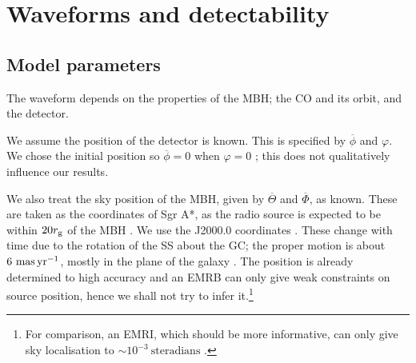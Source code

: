 \section{Waveforms and detectability}\label{sec:Waveforms}

\subsection{Model parameters}

The waveform depends on the properties of the MBH; the CO and its orbit, and the detector.

We assume the position of the detector is known. This is specified by $\overline{\phi}$ and $\varphi$. We chose the initial position so $\overline{\phi} = 0$ when $\varphi = 0$ \citep{Cutler1998}; this does not qualitatively influence our results.

We also treat the sky position of the MBH, given by $\overline{\Theta}$ and $\overline{\Phi}$, as known. These are taken as the coordinates of Sgr A*, as the radio source is expected to be within $20 r_\mathrm{g}$ of the MBH \citep{Reid2003,Doeleman2008}. We use the J2000.0 coordinates \citep{Reid1999, Yusef-Zadeh1999}. These change with time due to the rotation of the SS about the GC; the proper motion is about $6~\mathrm{mas\,yr^{-1}}$, mostly in the plane of the galaxy \citep{Reid1999, Backer1999, Reid2003}. The position is already determined to high accuracy and an EMRB can only give weak constraints on source position, hence we shall not try to infer it.\footnote{For comparison, an EMRI, which should be more informative, can only give sky localisation to $\sim 10^{-3}~\mathrm{steradians}$ \citep{Barack2004, Huerta2009}.}

